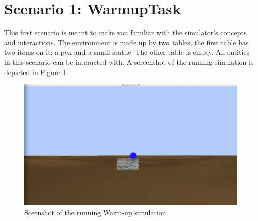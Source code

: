 \section{Scenario 1: WarmupTask} %
\label{sec:eval_warmup_scenario}
This first scenario is meant to make you familiar with the simulator's concepts and interactions. The environment is made up by two tables; the first table has two items on it: a pen and a small statue. The other table is empty. All entities in this scenario can be interacted with. A screenshot of the running simulation is depicted in Figure \ref{fig:eval_warump}.\\

\begin{figure}[H]
	\centering
	\includegraphics[width=0.8\linewidth]{gfx/Chapter_EvaluationScenarios/prototype1}
	\caption{Sceenshot of the running Warm-up simulation}
	\label{fig:eval_warump}
\end{figure}

